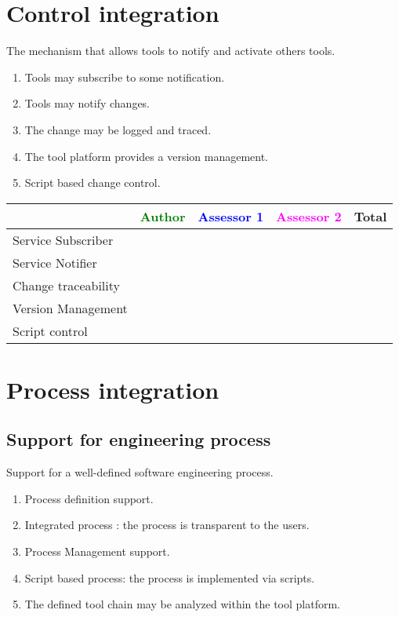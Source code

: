 \section{Control integration}
The mechanism that allows tools to notify and activate others tools.
\begin{enumerate}
\item Tools may subscribe to some notification.
\item Tools may notify changes.
\item The change may be logged and traced.
\item The tool platform provides a version management.
\item Script based change control.
\end{enumerate}

\begin{tabular}{|l | c | c | c | c|} \hline
  & \textcolor{green}{Author} & \textcolor{blue}{Assessor 1} &  \textcolor{magenta}{Assessor 2} & Total \\
  \hline Service Subscriber&
  &                 &                  &\\
  \hline Service Notifier &
  &                 &                  &\\
  \hline Change traceability &
  &                 &                  &\\
  \hline Version Management &
  &                 &                  &\\
  \hline Script control &
  &                 &                  &\\
  \hline
\end{tabular}


\section{Process integration}
\subsection{Support for engineering process}
Support for a well-defined software engineering process. 
\begin{enumerate}
\item Process definition support.
\item Integrated process : the process is transparent to the users.
\item Process Management support.
\item Script based process: the process is implemented via scripts.
\item The defined tool chain  may be analyzed within the tool platform.
\end{enumerate}

